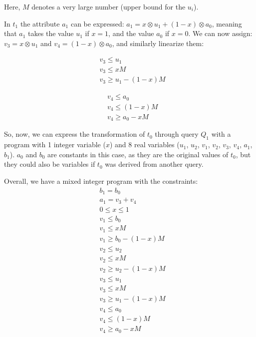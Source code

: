 \smallskip

Here, $M$ denotes a very large number (upper bound for the $u_i$).

\smallskip

In $t_1$ the attribute $a_1$ can be expressed: $a_1=x\otimes u_1 +
(1-x)\otimes a_0$, meaning that $a_1$ takes the value $u_1$ if $x=1$, and the
value $a_0$ if $x=0$.  We can now assign: $v_3= x\otimes
u_1$ and $v_4=(1-x)\otimes a_0$, and similarly linearize them:

\begin{minipage}{0.7\textwidth}
    \begin{minipage}[t]{0.2\textwidth}
        \begin{align*}
            &v_3\le u_1\\
            &v_3\le xM\\
            &v_3\ge u_1 - (1-x)M
        \end{align*}
    \end{minipage}
    \hspace{4em}
    \begin{minipage}[t]{0.2\textwidth}
        \begin{align*}
            &v_4\le a_0\\
            &v_4\le (1-x)M\\
            &v_4\ge a_0 - xM
        \end{align*}
    \end{minipage}
\end{minipage}

So, now, we can express the transformation of $t_0$ through query $Q_1$ with a
program with 1 integer variable ($x$) and 8 real variables ($u_1$, $u_2$,
$v_1$, $v_2$, $v_3$, $v_4$, $a_1$, $b_1$). $a_0$ and $b_0$ are constants in
this case, as they are the original values of $t_0$, but they could also be
variables if $t_0$ was derived from another query.

Overall, we have a mixed integer program with the constraints:
\begin{align*}
    &b_1=b_0\\
    &a_1 = v_3+v_4\\
    &0\leq x\leq 1\\
    &v_1\le b_0\\
    &v_1\le xM\\
    &v_1\ge b_0 - (1-x)M\\
    &v_2\le u_2\\
    &v_2\le xM\\
    &v_2\ge u_2 - (1-x)M\\
    &v_3\le u_1\\
    &v_3\le xM\\
    &v_3\ge u_1 - (1-x)M\\
    &v_4\le a_0\\
    &v_4\le (1-x)M\\
    &v_4\ge a_0 - xM
\end{align*}

